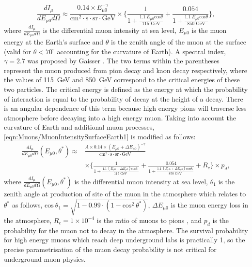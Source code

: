 \begin{equation}
    \label{eqn:Muons/MuonIntensitySurfaceEarth1}
    \frac{dI_\mu}{dE_{\mu0}d\Omega}\approx\frac{0.14\times E^{-\gamma}_{\mu0}}{\text{cm}^2\cdot\text{s}\cdot\text{sr}\cdot\text{GeV}}\times\Biggl\{\frac{1}{1+\frac{1.1\:E_{\mu0}\text{cos}\theta}{115\text{ GeV}}}+\frac{0.054}{1+\frac{1.1\:E_{\mu0}\text{cos}\theta}{850\text{ GeV}}}\Biggl\},
\end{equation}
where $\frac{dI_\mu}{dE_{\mu0}d\Omega}$ is the differential muon intensity at sea level, $E_{\mu0}$ is the muon energy at the Earth's surface and $\theta$ is the zenith angle of the muon at the surface (valid for $\theta<70^\circ$ accounting for the curvature of Earth). A spectral index, $\gamma=2.7$ was proposed by Gaisser \cite{Gaisser_Engel_Resconi_2016}. The two terms within the parentheses represent the muon produced from pion decay and kaon decay respectively, where the values of 115~GeV and 850~GeV correspond to the critical energies of these two particles. The critical energy is defined as the energy at which the probability of interaction is equal to the probability of decay at the height of a decay. There is an angular dependence of this term because high energy pions will traverse less atmosphere before decaying into a high energy muon.
Taking into account the curvature of Earth and additional muon processes, \autoref{eqn:Muons/MuonIntensitySurfaceEarth1} is modified as follows:
\begin{equation}
\label{eqn:Muons/MuonIntensitySurfaceEarth2}
\begin{split}    
    \frac{dI_\mu}{dE_{\mu0}d\Omega}(E_{\mu0},\theta^*)\approx&\frac{A\times 0.14\times (E_{\mu0}+\Delta E_{\mu0})^{-\gamma}}{\text{cm}^2\cdot\text{s}\cdot\text{sr}\cdot\text{GeV}}\\
    &\times\Biggl\{\frac{1}{1+\frac{1.1\:(E_{\mu0}+\Delta E_{\mu0})\text{cos}\theta_1}{115\text{ GeV}}}+\frac{0.054}{1+\frac{1.1\:(E_{\mu0}+\Delta E_{\mu0})\text{cos}\theta_1}{850\text{ GeV}}}+R_c\Biggl\}\times p_d,
\end{split}
\end{equation}
where $\frac{dI_\mu}{dE_{\mu0}d\Omega}(E_{\mu0},\theta^*)$ is the differential muon intensity at sea level, $\theta_1$ is the zenith angle at production of site of the muon in the atmosphere which relates to $\theta^*$ as follows, $\text{cos}\:\theta_1=\sqrt{1-0.99\cdot(1-\text{cos}^2\:\theta^*)}$, $\Delta E_{\mu0}$ is the muon energy loss in the atmosphere, $R_c=1\times10^{-4}$ is the ratio of muons to pions \cite{LVD:1998lir}, and $p_d$ is the probability for the muon not to decay in the atmosphere. The survival probability for high energy muons which reach deep underground labs is practically 1, so the precise parametrisation of the muon decay probability is not critical for underground muon physics.

